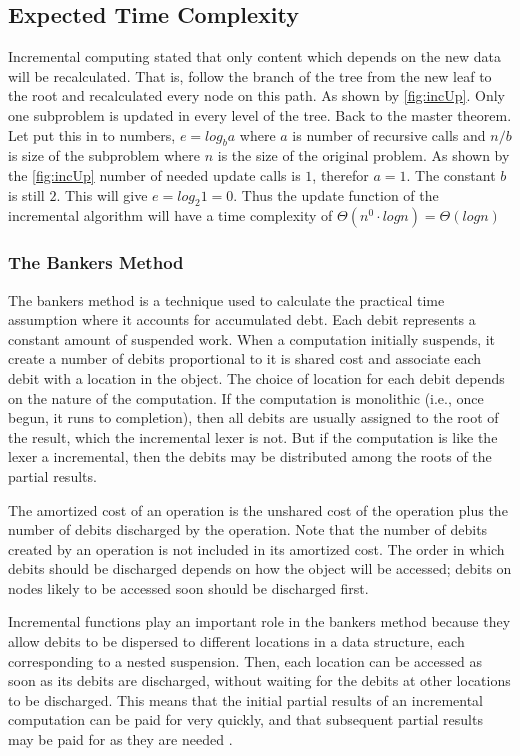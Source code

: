 \subsection{Expected Time Complexity}
Incremental computing stated that only content which depends on the new
data will be recalculated. That is, follow the branch of the tree from the new
leaf to the root and recalculated every node on this path. 
As shown by \cref{fig:incUp}. Only one subproblem is updated in every level of
the tree. Back to the master theorem. Let put this in to numbers, $e = log_b a$
where $a$ is number of recursive calls and $n/b$ is size of the subproblem where
$n$ is the size of the original problem. As shown by the \cref{fig:incUp} number
of needed update calls is $1$, therefor $a = 1$. The constant $b$ is still $2$.
This will give $e = log_2 1 = 0$. Thus the update function of the incremental
algorithm will have a time complexity of
$\Theta(n^0 \cdot log n) = \Theta(log n)$

\subsubsection{The Bankers Method}
The bankers method is a technique used to calculate the practical time
assumption where it accounts for accumulated debt. Each debit represents
a constant amount of suspended work. When a computation initially suspends, it
create a number of debits proportional to it is shared cost and
associate each debit with a location in the object. The choice of location for
each debit depends on the nature of the computation. If the computation is
monolithic (i.e., once begun, it runs to completion), then all debits are
usually assigned to the root of the result, which the incremental lexer is not. 
But if the computation is like the lexer a incremental, then the debits may be 
distributed among the roots of the partial results.

The amortized cost of an operation is the unshared cost of the operation
plus the number of debits discharged by the operation. Note that the number
of debits created by an operation is not included in its amortized cost. The
order in which debits should be discharged depends on how the object will
be accessed; debits on nodes likely to be accessed soon should be discharged
first.

Incremental functions play an important role in the bankers method because
they allow debits to be dispersed to different locations in a data structure,
each corresponding to a nested suspension. Then, each location can be accessed
as soon as its debits are discharged, without waiting for the debits at other
locations to be discharged. This means that the initial partial results of
an incremental computation can be paid for very quickly, and that subsequent
partial results may be paid for as they are needed \cite{Okasaki1999}.


